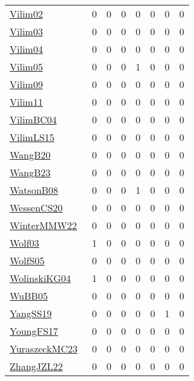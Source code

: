 {\begin{longtable}{l*{7}{r}}
\href{papers/Vilim02.pdf}{Vilim02}~\cite{Vilim02} & 0 & 0 & 0 & 0 & 0 & 0 & 0\\
\href{papers/Vilim03.pdf}{Vilim03}~\cite{Vilim03} & 0 & 0 & 0 & 0 & 0 & 0 & 0\\
\href{papers/Vilim04.pdf}{Vilim04}~\cite{Vilim04} & 0 & 0 & 0 & 0 & 0 & 0 & 0\\
\href{papers/Vilim05.pdf}{Vilim05}~\cite{Vilim05} & 0 & 0 & 0 & 1 & 0 & 0 & 0\\
\href{papers/Vilim09.pdf}{Vilim09}~\cite{Vilim09} & 0 & 0 & 0 & 0 & 0 & 0 & 0\\
\href{papers/Vilim11.pdf}{Vilim11}~\cite{Vilim11} & 0 & 0 & 0 & 0 & 0 & 0 & 0\\
\href{papers/VilimBC04.pdf}{VilimBC04}~\cite{VilimBC04} & 0 & 0 & 0 & 0 & 0 & 0 & 0\\
\href{papers/VilimLS15.pdf}{VilimLS15}~\cite{VilimLS15} & 0 & 0 & 0 & 0 & 0 & 0 & 0\\
\href{papers/WangB20.pdf}{WangB20}~\cite{WangB20} & 0 & 0 & 0 & 0 & 0 & 0 & 0\\
\href{papers/WangB23.pdf}{WangB23}~\cite{WangB23} & 0 & 0 & 0 & 0 & 0 & 0 & 0\\
\href{papers/WatsonB08.pdf}{WatsonB08}~\cite{WatsonB08} & 0 & 0 & 0 & 1 & 0 & 0 & 0\\
\href{papers/WessenCS20.pdf}{WessenCS20}~\cite{WessenCS20} & 0 & 0 & 0 & 0 & 0 & 0 & 0\\
\href{papers/WinterMMW22.pdf}{WinterMMW22}~\cite{WinterMMW22} & 0 & 0 & 0 & 0 & 0 & 0 & 0\\
\href{papers/Wolf03.pdf}{Wolf03}~\cite{Wolf03} & 1 & 0 & 0 & 0 & 0 & 0 & 0\\
\href{papers/WolfS05.pdf}{WolfS05}~\cite{WolfS05} & 0 & 0 & 0 & 0 & 0 & 0 & 0\\
\href{papers/WolinskiKG04.pdf}{WolinskiKG04}~\cite{WolinskiKG04} & 1 & 0 & 0 & 0 & 0 & 0 & 0\\
\href{papers/WuBB05.pdf}{WuBB05}~\cite{WuBB05} & 0 & 0 & 0 & 0 & 0 & 0 & 0\\
\href{papers/YangSS19.pdf}{YangSS19}~\cite{YangSS19} & 0 & 0 & 0 & 0 & 0 & 1 & 0\\
\href{papers/YoungFS17.pdf}{YoungFS17}~\cite{YoungFS17} & 0 & 0 & 0 & 0 & 0 & 0 & 0\\
\href{papers/YuraszeckMC23.pdf}{YuraszeckMC23}~\cite{YuraszeckMC23} & 0 & 0 & 0 & 0 & 0 & 0 & 0\\
\href{papers/ZhangJZL22.pdf}{ZhangJZL22}~\cite{ZhangJZL22} & 0 & 0 & 0 & 0 & 0 & 0 & 0\\

\end{longtable}}

